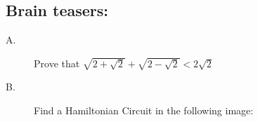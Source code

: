\documentclass{article}
\begin{document}
\subsection*{Brain teasers:}
\begin{description}
\item[A.] Prove that $\sqrt{2 + \sqrt{2}} + \sqrt{2 - \sqrt{2}} < 2\sqrt{2}$

\item[B.] Find a Hamiltonian Circuit in the following image: %

\end{description}
\end{document}
